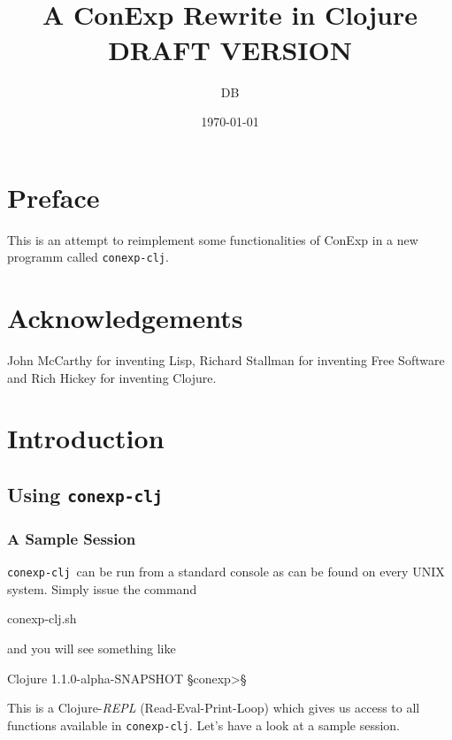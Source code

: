 \documentclass{scrbook}
\title{\conexpclj\\A ConExp Rewrite in Clojure\\[2cm]DRAFT VERSION}
\author{DB}
\date{\today}
\newcommand{\conexpclj}{\texttt{conexp-clj}}
\newcommand{\p}{\color{lightblue}}
\theoremstyle{plain}
\theoremstyle{plain}
\theoremstyle{plain}
\theoremstyle{nonumberplain}
\begin{document}
\maketitle


\chapter*{Preface}

This is an attempt to reimplement some functionalities of ConExp in a
new programm called \conexpclj.


\chapter*{Acknowledgements}

John McCarthy for inventing Lisp, Richard Stallman for inventing Free
Software and Rich Hickey for inventing Clojure.


\tableofcontents


\chapter{Introduction}

\section{Using \conexpclj}

\subsection{A Sample Session}

\conexpclj\ can be run from a standard console as can be found on every UNIX system. Simply issue
the command
\begin{conexp}
  conexp-clj.sh
\end{conexp}
and you will see something like
\begin{conexp}
  Clojure 1.1.0-alpha-SNAPSHOT
  §\p conexp>§
\end{conexp}
This is a Clojure-\emph{REPL} (Read-Eval-Print-Loop) which gives us access to all functions
available in \conexpclj. Let's have a look at a sample session.
\end{document}
